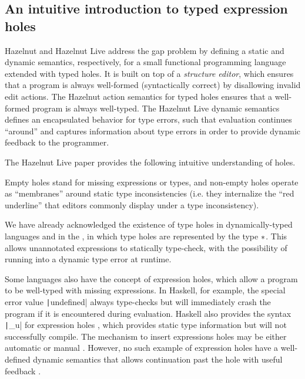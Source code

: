 \subsection{An intuitive introduction to typed expression holes}
\label{sec:typed-holes}

Hazelnut and Hazelnut Live address the gap problem by defining a static and dynamic semantics, respectively, for a small functional programming language extended with typed holes. It is built on top of a \textit{structure editor}, which ensures that a program is always well-formed (syntactically correct) by disallowing invalid edit actions. The Hazelnut action semantics for typed holes ensures that a well-formed program is always well-typed. The Hazelnut Live dynamic semantics defines an encapsulated behavior for type errors, such that evaluation continues ``around'' and captures information about type errors in order to provide dynamic feedback to the programmer.

The Hazelnut Live paper provides the following intuitive understanding of holes.

\begin{displayquote}
  Empty holes stand for missing expressions or types, and non-empty holes operate as ``membranes''
around static type inconsistencies (i.e. they internalize the ``red underline'' that editors commonly display under a type inconsistency).
\end{displayquote}

We have already acknowledged the existence of type holes in dynamically-typed languages and in the \gtclc{}, in which type holes are represented by the type $*$. This allows unannotated expressions to statically type-check, with the possibility of running into a dynamic type error at runtime.

Some languages also have the concept of expression holes, which allow a program to be well-typed with missing expressions. In Haskell, for example, the special error value \texttt|undefined| always type-checks but will immediately crash the program if it is encountered during evaluation. Haskell also provides the syntax \texttt|_u| for expression holes , which provides static type information but will not successfully compile. The mechanism to insert expressions holes may be either automatic or manual . However, no such example of expression holes have a well-defined dynamic semantics that allows continuation past the hole with useful feedback .

